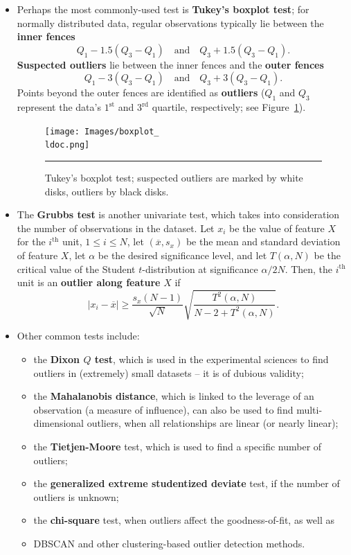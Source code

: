 \begin{itemize}[noitemsep]
\item Perhaps the most commonly-used test is \textbf{Tukey's boxplot test}; for normally distributed data, regular observations typically lie between the \textbf{inner fences} $$Q_1-1.5(Q_3-Q_1) \quad\mbox{and}\quad Q_3+1.5(Q_3-Q_1).$$ \textbf{Suspected outliers} lie between the inner fences and the \textbf{outer fences} 
$$Q_1-3(Q_3-Q_1) \quad\mbox{and}\quad Q_3+3(Q_3-Q_1).$$
Points beyond the outer fences are identified as \textbf{outliers} ($Q_1$ and $Q_3$ represent the data's   $1^{\textrm{st}}$ and $3^{\textrm{rd}}$ quartile, respectively; see Figure~\ref{fig:boxplot}).
\begin{figure}[t]
\centering
\texttt{[image: Images/boxplot\_\\ldoc.png]}
\caption[\small Tukey's boxplot test for outliers]{\small Tukey's boxplot test; suspected outliers are marked by white disks, outliers by black disks.}
\hrule\label{fig:boxplot}
\end{figure}
\afterpage{\FloatBarrier}
\item The \textbf{Grubbs test} is another univariate test, which takes into consideration the number of observations in the dataset. Let $x_i$ be the value of feature $X$ for the $i^{\textrm{th}}$ unit, $1\leq i\leq N$, let $(\overline{x},s_x)$ be the mean and standard deviation of feature $X$, let $\alpha$ be the desired significance level, and let  $T(\alpha,N)$ be the critical value of the Student $t$-distribution at significance $\alpha/2N$. Then, the $i^{\textrm{th}}$ unit is an \textbf{outlier along feature} $X$ if $$|x_i-\overline{x}| \geq \frac{s_x(N-1)}{\sqrt{N}}\sqrt{\frac{T^2(\alpha,N)}{N-2+T^2(\alpha,N)}}.$$
\item Other common tests include:
\begin{itemize}[noitemsep]
\item the \textbf{Dixon $Q$ test}, which is used in the experimental sciences to find outliers in (extremely) small datasets -- it is of dubious validity;
\item the \textbf{Mahalanobis distance}, which is linked to the leverage of an observation (a measure of influence), can also be used to find multi-dimen\-sio\-nal outliers, when all relationships are linear (or nearly linear);
\item the \textbf{Tietjen-Moore} test, which is used to find a specific number of outliers;
\item the \textbf{generalized extreme studentized deviate} test, if the number of outliers is unknown; 
\item the \textbf{chi-square} test, when outliers affect the goodness-of-fit, as well as 
\item DBSCAN and other clustering-based outlier detection methods.
\end{itemize}
\end{itemize}
